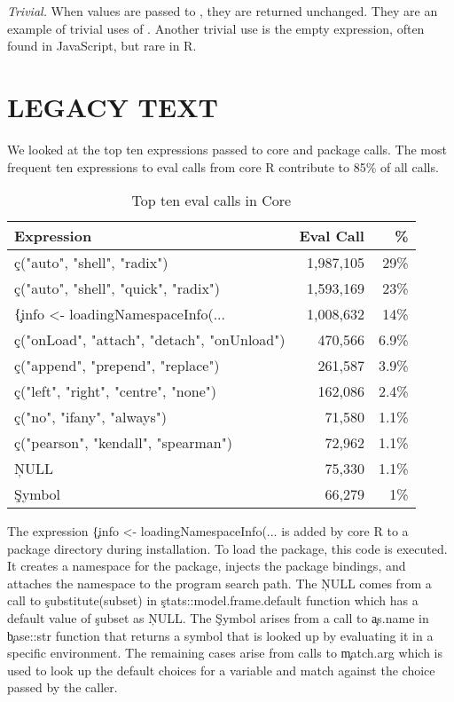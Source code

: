 \documentclass[screen,acmsmall]{acmart}
\newcommand{\mypara}[1]{\medskip\noindent\emph{#1}\xspace}
\begin{document}
\mypara{Trivial.} When values are passed to \eval, they are returned
unchanged. They are an example of trivial uses of \eval. Another
trivial use is the empty expression, often found in JavaScript, but
rare in R.

\section{LEGACY TEXT}

We looked at the top ten expressions passed to core and package \eval
calls. The most frequent ten expressions to eval calls from core R
contribute to 85\% of all \eval calls.

\begin{table}[!h] \centering
\begin{tabular}{@{}l|rr@{}} \hline
Expression & Eval Call &  \% \\\hline
\c{c("auto", "shell", "radix")} & 1,987,105 & 29\%\\
\c{c("auto", "shell", "quick", "radix")} & 1,593,169  & 23\%\\
\c{\{info <- loadingNamespaceInfo(...} & 1,008,632 &       14\%\\
\c{c("onLoad", "attach", "detach", "onUnload")}   & 470,566 &      6.9\%\\
\c{c("append", "prepend", "replace")} &              261,587&       3.9\% \\
\c{c("left", "right", "centre", "none")} & 162,086     & 2.4\%\\
\c{c("no", "ifany", "always")}   &                71,580 &       1.1\%\\
\c{c("pearson", "kendall", "spearman")}  & 72,962 &      1.1\%\\
\c{NULL}& 75,330  &      1.1\% \\
\c{Symbol}&                 66,279&       1\%\\\hline
\end{tabular}
\caption{Top ten eval calls in Core}\label{B}
\end{table}

The expression \c{\{info <- loadingNamespaceInfo(...} is added by core R to a
package directory during installation. To load the package, this code is
executed. It creates a namespace for the package, injects the package bindings,
and attaches the namespace to the program search path. The \c{NULL} comes from a
call to \c{substitute(subset)} in \c{stats::model.frame.default} function which
has a default value of \c{subset} as \c{NULL}. The \c{Symbol} arises from a call
to \c{as.name} in \c{base::str} function that returns a symbol that is looked up
by evaluating it in a specific environment. The remaining cases arise from calls
to \c{match.arg} which is used to look up the default choices for a variable and
match against the choice passed by the caller.
\end{document}
